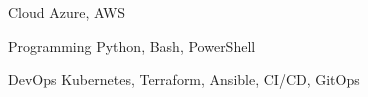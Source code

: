


\begin{cvskills}


\cvskill
{Cloud} %
{Azure, AWS} %


\cvskill
{Programming} %
{Python, Bash, PowerShell} %


\cvskill
{DevOps} %
{Kubernetes, Terraform, Ansible, CI/CD, GitOps} %


\end{cvskills}
